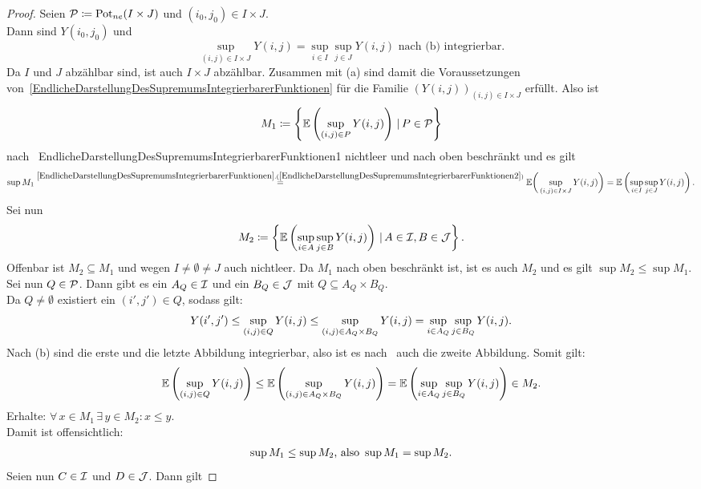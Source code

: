 \begin{proof}
Seien $\mathcal{P}\coloneqq  \mathop{\textrm{Pot}}\nolimits_{ne}(I \times J)$ und $(i_0, j_0) \in I \times J$.\\
Dann sind $Y(i_0, j_0)$ und
\[\sup_{(i, j) \in I \times J}Y(i, j)= \sup_{i \in I} \sup_{j \in J}Y(i, j)
\text{ nach (b) integrierbar.}\]
Da $I$ und $J$ abzählbar sind, ist auch $I \times J$ abzählbar.
Zusammen mit (a) sind damit die Voraussetzungen von~\ref{EndlicheDarstellungDesSupremumsIntegrierbarerFunktionen} für die Familie
$(Y(i,j))_{(i,j) \in I \times J}$ erfüllt. Also ist
\[M_1\coloneqq \left\{\mathbb{E}\left(\sup_{(i, j) \in P}Y(i,j) \right)\,|\,P \in \mathcal{P}\right\}\]
nach~
{EndlicheDarstellungDesSupremumsIntegrierbarerFunktionen1} nichtleer und nach
oben beschränkt und es gilt
\begin{align}\sup M_1
\overset{\refclaim{EndlicheDarstellungDesSupremumsIntegrierbarerFunktionen}
{EndlicheDarstellungDesSupremumsIntegrierbarerFunktionen2}}= 
\E\bigg(\sup_{(i, j) \in I \times J}Y(i, j) \bigg)
= \E\left(\sup_{i \in I}\sup_{j \in J}Y(i,j)\right)\text. \label{feeeiieq:1}
\end{align}
Sei nun 
\[M_2 \coloneqq  \left\{\mathbb{E}\left(\sup_{i \in A}\sup_{j \in B}Y(i,j) \right)\,|\,A \in \mathcal{I}, B \in \mathcal{J}\right\}\text.\]
Offenbar ist $M_2 \subseteq M_1$ und wegen $I \neq \emptyset\neq J$ auch
nichtleer.
Da $M_1$ nach oben beschränkt ist, ist es auch
$M_2$ und es gilt $\sup M_2 \le \sup M_1$.\\
Sei nun $Q \in \mathcal{P}$. Dann gibt es ein
$A_Q \in \mathcal{I}$ und ein $B_Q \in \mathcal{J}$ mit 
$Q \subseteq A_Q \times B_Q$.\\
Da $Q \neq \emptyset$ existiert ein $(i', j') \in Q$, sodass gilt:
\[Y(i',j')\le\sup_{(i,j)\in Q}Y(i,j)\le\sup_{(i,j)\in A_Q\times B_Q}Y(i,j)
=\sup_{i\in A_Q}\sup_{j\in B_Q}Y(i,j)\text.\]
Nach (b) sind die erste und die letzte Abbildung integrierbar, also ist
es nach~
auch die zweite Abbildung. Somit gilt:
\[\mathbb{E}\left(\sup_{(i, j) \in Q}Y(i, j) \right) \le 
\mathbb{E}\left(\sup_{(i, j) \in A_Q \times B_Q}Y(i, j) \right)
= \mathbb{E}\left(\sup_{i \in A_Q}\sup_{j \in B_Q}Y(i, j) \right) \in M_2\text.\]
Erhalte: $\forall \, x \in M_1\, \exists \, y \in M_2: x \le y$.\\
Damit ist offensichtlich:
\begin{align}
 \sup M_1\le\sup M_2\text{, also }
\sup M_1=\sup M_2\text. \label{feeeiieq:2}
\end{align}
Seien nun $C \in \mathcal{I}$ und $D \in \mathcal{J}$. Dann gilt

\end{proof}
